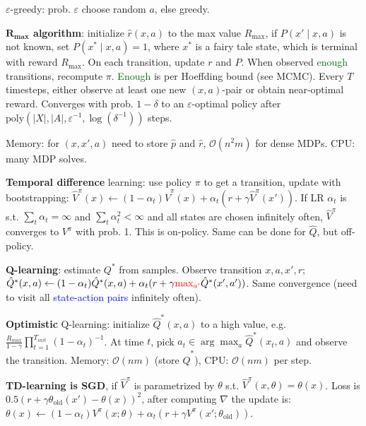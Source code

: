 \documentclass[11pt,landscape,a4paper,fleqn]{article}
\begin{document}
\begin{multicols*}{4}
\(\varepsilon\)-greedy: prob. \(\varepsilon\) choose random \(a\), else greedy.

\textbf{\(\mathbf{R_{max}}\) algorithm}: initialize \(\hat{r}(x, a)\) to the max value \(R_{\mathrm{max}}\),
if \(P(x' \mid x, a)\) is not known, set \(P(x^* \mid x, a) = 1\), where \(x^*\) is a fairy tale state,
which is terminal with reward \(R_{\mathrm{max}}\).
On each transition, update \(r\) and \(P\). When observed \textcolor{darkgreen}{enough} transitions, recompute \(\pi\).
\textcolor{darkgreen}{Enough} is per Hoeffding bound (see MCMC).
Every \(T\) timesteps, either observe at least one new \((x,a)\)-pair or obtain near-optimal reward.
Converges with prob. \(1 - \delta\) to an \(\varepsilon\)-optimal policy after \(\mathrm{poly}(|X|, |A|, \varepsilon^{-1}, \log(\delta^{-1}))\) steps.

Memory: for \((x, x', a)\) need to store \(\hat{p}\) and \(\hat{r}\), \(\mathcal{O}(n^2 m)\) for dense MDPs.
CPU: many MDP solves.

\textbf{Temporal difference} learning:
use policy \(\pi\) to get a transition,
update with bootstrapping: \(\hat{V}^\pi(x) \leftarrow (1 - \alpha_t) \hat{V}^\pi(x) + \alpha_t(r + \gamma \hat{V}^\pi(x'))\).
If LR \(\alpha_t\) is s.t. \(\sum_t \alpha_t = \infty\) and \(\sum_t \alpha_t^2 < \infty\)
and all states are chosen infinitely often, \(\hat{V}^\pi\) converges to \(V^\pi\) with prob. 1.
This is on-policy.
Same can be done for \(\hat{Q}\), but off-policy.

\textbf{Q-learning}: estimate \(Q^*\) from samples.
Observe transition \(x, a, x', r\);
\(\hat{Q}^*(x, a) \leftarrow (1 - \alpha_t) \hat{Q}^*(x, a) + \alpha_t(r + \gamma \textcolor{red}{\max_{a'}} \hat{Q}^*(x', a'))\).
Same convergence (need to visit all \textcolor{blue}{state-action pairs} infinitely often).

\textbf{Optimistic} Q-learning: initialize \(\hat{Q}^*(x, a)\) to a high value, e.g.
\(\frac{R_{max}}{1 - \gamma} \prod_{t = 1}^{T_{init}} (1 - \alpha_t)^{-1}\).
At time \(t\), pick \(a_t \in \arg\max_a \hat{Q}^*(x_t, a)\) and observe the transition.
Memory: \(\mathcal{O}(nm)\) (store \(\hat{Q}^*\)), CPU: \(\mathcal{O}(nm)\) per step.

\textbf{TD-learning is SGD}, if \(\hat{V}^\pi\) is parametrized by \(\theta\) s.t. \(\hat{V}^\pi(x, \theta) = \theta(x)\).
Loss is \(0.5(r + \gamma \theta_{\mathrm{old}}(x') - \theta(x))^2\),
after computing \(\nabla\) the update is:
\(\theta(x) \leftarrow (1 - \alpha_t)V^\pi(x; \theta) + \alpha_t(r + \gamma V^\pi(x'; \theta_{\mathrm{old}}))\).


\end{multicols*}
\end{document}
